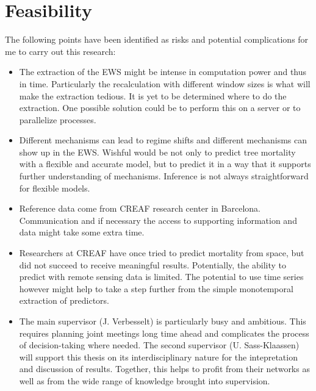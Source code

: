 \section{Feasibility}\label{sec:feasibility}
The following points have been identified as risks and potential complications for me to carry out this research:
\begin{itemize}
	\item The extraction of the EWS might be intense in computation power and thus in time. Particularly the recalculation with different window sizes is what will make the extraction tedious. It is yet to be determined where to do the extraction. One possible solution could be to perform this on a server or to parallelize processes.
	\item Different mechanisms can lead to regime shifts and different mechanisms can show up in the EWS. Wishful would be not only to predict tree mortality with a flexible and accurate model, but to predict it in a way that it supports further understanding of mechanisms. Inference is not always straightforward for flexible models.
	\item Reference data come from CREAF research center in Barcelona. Communication and if necessary the access to supporting information and data might take some extra time.
	\item Researchers at CREAF have once tried to predict mortality from space, but did not succeed to receive meaningful results. Potentially, the ability to predict with remote sensing data is limited. The potential to use time series however might help to take a step further from the simple monotemporal extraction of predictors.
	\item The main supervisor (J. Verbesselt) is particularly busy and ambitious. This requires planning joint meetings long time ahead and complicates the process of decision-taking where needed. The second supervisor (U. Sass-Klaassen) will support this thesis on its interdisciplinary nature for the intepretation and discussion of results. Together, this helps to profit from their networks as well as from the wide range of knowledge brought into supervision.
\end{itemize}